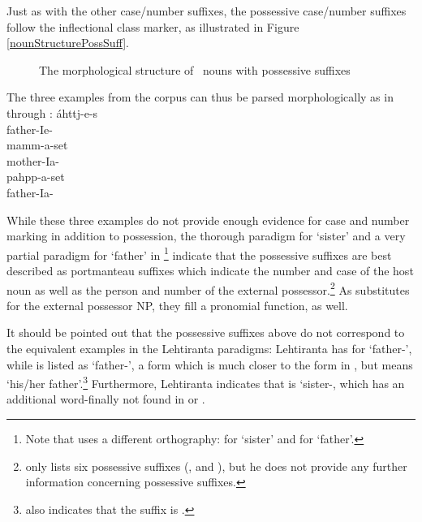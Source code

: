 Just as with the other case/number suffixes, the possessive case/number suffixes follow the inflectional class marker, as illustrated in Figure \vref{nounStructurePossSuff}. %
\begin{figure}\centering
{}
\caption{The morphological structure of \PS\ nouns with possessive suffixes}\label{nounStructurePossSuff}
\end{figure}

The three examples from the corpus can thus be parsed morphologically as in  through :
\ea\label{possSuffixParse1}
\gll	áhttj-e-s\\
	father-Ie-\\\nopagebreak
{}
\z
\ea\label{possSuffixParse2}
\gll	mamm-a-set\\
	mother-Ia-\\\nopagebreak
{}
\z
\ea\label{possSuffixParse3}
\gll	pahpp-a-set\\
	father-Ia-\\\nopagebreak
{}
\z

While these three examples do not provide enough evidence for case and number marking in addition to possession, the thorough paradigm for  ‘sister’ and a very partial paradigm for  ‘father’ in \citet[158-159]{Lehtiranta1992}\footnote{Note that \citet{Lehtiranta1992} uses a different orthography:  for ‘sister’ and  for ‘father’.} indicate that the possessive suffixes are best described as portmanteau suffixes which indicate the number and case of the host noun as well as the person and number of the external possessor.\footnote{\citet[110]{Lagercrantz1926} only lists six possessive suffixes (,  and ), but he does not provide any further information concerning possessive suffixes.}
As substitutes for the external possessor NP, they fill a pronomial function, as well. %

It should be pointed out that the possessive suffixes above do not correspond to the equivalent examples in the Lehtiranta paradigms: Lehtiranta has  for ‘father-’, while  is listed as ‘father-’, a form which is much closer to the form in , but means ‘his/her father’.\footnote{\citet[110]{Lagercrantz1926} also indicates that the  suffix is .} 
Furthermore, Lehtiranta indicates that  is ‘sister-, which has an additional  word-finally not found in  or . 

